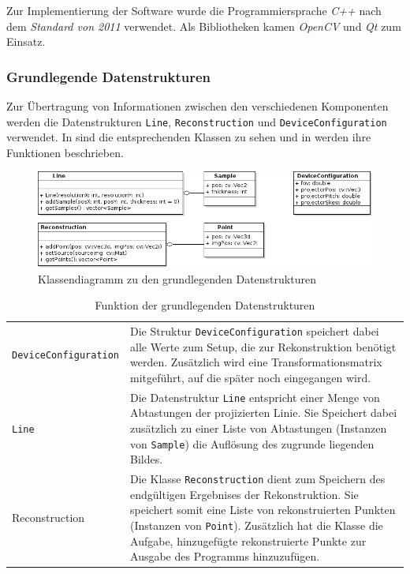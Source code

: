 \documentclass[ngerman,a4paper,parskip=half]{scrartcl}
\begin{document}
Zur Implementierung der Software wurde die Programmiersprache \emph{C++} nach dem \emph{Standard von 2011} verwendet. Als Bibliotheken kamen \emph{OpenCV} und \emph{Qt} zum Einsatz.

\subsubsection{Grundlegende Datenstrukturen}

Zur Übertragung von Informationen zwischen den verschiedenen Komponenten werden die Datenstrukturen \texttt{Line}, \texttt{Reconstruction} und \texttt{DeviceConfiguration} verwendet. In  sind die entsprechenden Klassen zu sehen und in  werden ihre Funktionen beschrieben.

\begin{figure}
	\centering
	\includegraphics[width=\linewidth]{includes/classdiagram_base.png}
	\caption{Klassendiagramm zu den grundlegenden Datenstrukturen}
	\label{fig:classes_base}
\end{figure}

\begin{table}
	\begin{tabular}{lp{10cm}}
		\texttt{DeviceConfiguration} &
		Die Struktur \texttt{DeviceConfiguration} speichert dabei alle Werte zum Setup, die zur Rekonstruktion benötigt werden. Zusätzlich wird eine Transformationsmatrix mitgeführt, auf die später noch eingegangen wird.\\[1em]
		\texttt{Line}                &
		Die Datenstruktur \texttt{Line} entspricht einer Menge von Abtastungen der projizierten Linie. Sie Speichert dabei zusätzlich zu einer Liste von Abtastungen (Instanzen von \texttt{Sample}) die Auflösung des zugrunde liegenden Bildes.\\[1em]
		Reconstruction               &
		Die Klasse \texttt{Reconstruction} dient zum Speichern des endgültigen Ergebnises der Rekonstruktion. Sie speichert somit eine Liste von rekonstruierten Punkten (Instanzen von \texttt{Point}). Zusätzlich hat die Klasse die Aufgabe, hinzugefügte rekonstruierte Punkte zur Ausgabe des Programms hinzuzufügen.
	\end{tabular}
	\caption{Funktion der grundlegenden Datenstrukturen}
	\label{tab:classes_base}
\end{table}
\end{document}
